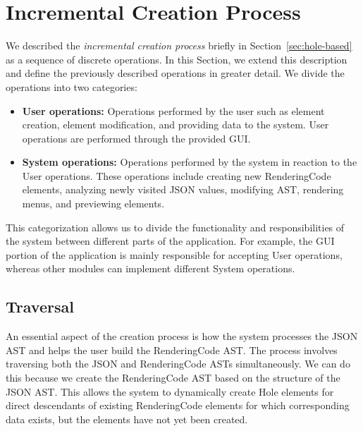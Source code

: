\section{Incremental Creation Process}
\label{sec:creation}
We described the \emph{incremental creation process} briefly in Section~\ref{sec:hole-based} as a sequence of discrete operations.
In this Section, we extend this description and define the previously described operations in greater detail.
We divide the operations into two categories:
\begin{itemize}
	\item \textbf{User operations:} Operations performed by the user such as element creation, element modification, and providing data to the system.
	      User operations are performed through the provided GUI.
	\item \textbf{System operations:} Operations performed by the system in reaction to the User operations.
	      These operations include creating new RenderingCode elements, analyzing newly visited JSON values, modifying AST, rendering menus, and previewing elements.
\end{itemize}
This categorization allows us to divide the functionality and responsibilities of the system between different parts of the application.
For example, the GUI portion of the application is mainly responsible for accepting User operations, whereas other modules can implement different System operations.


\subsection{Traversal}
\label{sec:traversal}
An essential aspect of the creation process is how the system processes the JSON AST and helps the user build the RenderingCode AST.
The process involves traversing both the JSON and RenderingCode ASTs simultaneously.
We can do this because we create the RenderingCode AST based on the structure of the JSON AST.
This allows the system to dynamically create Hole elements for direct descendants of existing RenderingCode elements for which corresponding data exists, but the elements have not yet been created.

